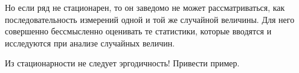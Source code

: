 Но если ряд не стационарен, то он заведомо не может
рассматриваться, как последовательность измерений одной и той же
случайной величины. Для него совершенно бессмысленно оценивать те
статистики, которые вводятся и исследуются при анализе случайных величин.

Из стационарности не следует эргодичность! Привести пример.
